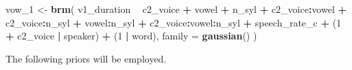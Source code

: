 \documentclass[11pt,]{article}
\newenvironment{Shaded}{\begin{snugshade}}{\end{snugshade}}
\newcommand{\DataTypeTok}[1]{\textcolor[rgb]{0.13,0.29,0.53}{#1}}
\newcommand{\DecValTok}[1]{\textcolor[rgb]{0.00,0.00,0.81}{#1}}
\newcommand{\KeywordTok}[1]{\textcolor[rgb]{0.13,0.29,0.53}{\textbf{#1}}}
\newcommand{\NormalTok}[1]{#1}
\newcommand{\OperatorTok}[1]{\textcolor[rgb]{0.81,0.36,0.00}{\textbf{#1}}}
\newcommand{\StringTok}[1]{\textcolor[rgb]{0.31,0.60,0.02}{#1}}
\begin{document}
\begin{Shaded}
\begin{Highlighting}[]
\NormalTok{vow_}\DecValTok{1}\NormalTok{ <-}\StringTok{ }\KeywordTok{brm}\NormalTok{(}
\NormalTok{  v1_duration }\OperatorTok{~}
\StringTok{    }\NormalTok{c2_voice }\OperatorTok{+}
\StringTok{    }\NormalTok{vowel }\OperatorTok{+}
\StringTok{    }\NormalTok{n_syl }\OperatorTok{+}
\StringTok{    }\NormalTok{c2_voice}\OperatorTok{:}\NormalTok{vowel }\OperatorTok{+}
\StringTok{    }\NormalTok{c2_voice}\OperatorTok{:}\NormalTok{n_syl }\OperatorTok{+}
\StringTok{    }\NormalTok{vowel}\OperatorTok{:}\NormalTok{n_syl }\OperatorTok{+}
\StringTok{    }\NormalTok{c2_voice}\OperatorTok{:}\NormalTok{vowel}\OperatorTok{:}\NormalTok{n_syl }\OperatorTok{+}
\StringTok{    }\NormalTok{speech_rate_c }\OperatorTok{+}
\StringTok{    }\NormalTok{(}\DecValTok{1} \OperatorTok{+}\StringTok{ }\NormalTok{c2_voice }\OperatorTok{|}\StringTok{ }\NormalTok{speaker) }\OperatorTok{+}
\StringTok{    }\NormalTok{(}\DecValTok{1} \OperatorTok{|}\StringTok{ }\NormalTok{word),}
  \DataTypeTok{family =} \KeywordTok{gaussian}\NormalTok{()}
\NormalTok{)}
\end{Highlighting}
\end{Shaded}

The following priors will be employed.
\end{document}
